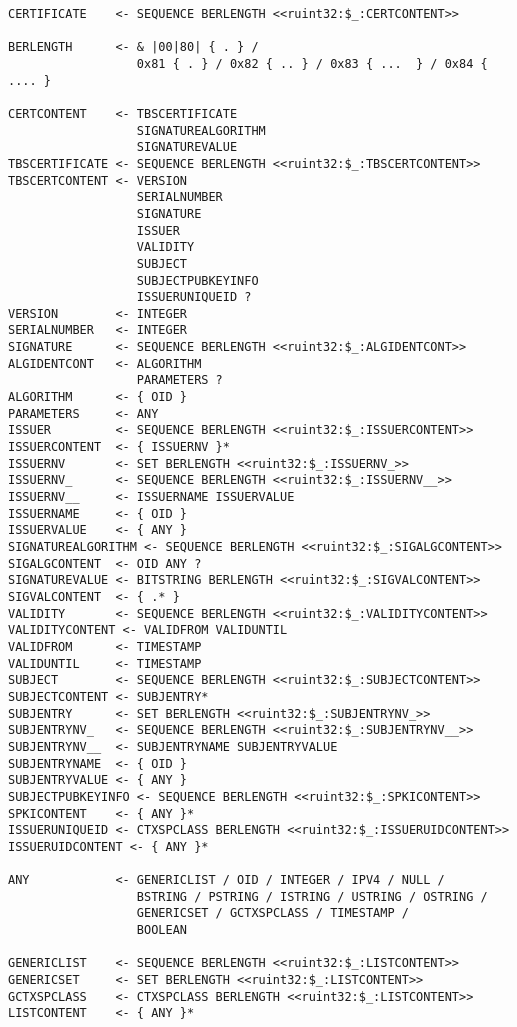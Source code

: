 \begin{changemargin}{-60mm}{0mm}
\begin{myquote}
\begin{verbatim}
CERTIFICATE    <- SEQUENCE BERLENGTH <<ruint32:$_:CERTCONTENT>>

BERLENGTH      <- & |00|80| { . } /
                  0x81 { . } / 0x82 { .. } / 0x83 { ...  } / 0x84 { .... }

CERTCONTENT    <- TBSCERTIFICATE
                  SIGNATUREALGORITHM
                  SIGNATUREVALUE
TBSCERTIFICATE <- SEQUENCE BERLENGTH <<ruint32:$_:TBSCERTCONTENT>>
TBSCERTCONTENT <- VERSION
                  SERIALNUMBER
                  SIGNATURE
                  ISSUER
                  VALIDITY
                  SUBJECT
                  SUBJECTPUBKEYINFO
                  ISSUERUNIQUEID ?
VERSION        <- INTEGER
SERIALNUMBER   <- INTEGER
SIGNATURE      <- SEQUENCE BERLENGTH <<ruint32:$_:ALGIDENTCONT>>
ALGIDENTCONT   <- ALGORITHM
                  PARAMETERS ?
ALGORITHM      <- { OID }
PARAMETERS     <- ANY
ISSUER         <- SEQUENCE BERLENGTH <<ruint32:$_:ISSUERCONTENT>>
ISSUERCONTENT  <- { ISSUERNV }*
ISSUERNV       <- SET BERLENGTH <<ruint32:$_:ISSUERNV_>>
ISSUERNV_      <- SEQUENCE BERLENGTH <<ruint32:$_:ISSUERNV__>>
ISSUERNV__     <- ISSUERNAME ISSUERVALUE
ISSUERNAME     <- { OID }
ISSUERVALUE    <- { ANY }
SIGNATUREALGORITHM <- SEQUENCE BERLENGTH <<ruint32:$_:SIGALGCONTENT>>
SIGALGCONTENT  <- OID ANY ?
SIGNATUREVALUE <- BITSTRING BERLENGTH <<ruint32:$_:SIGVALCONTENT>>
SIGVALCONTENT  <- { .* }
VALIDITY       <- SEQUENCE BERLENGTH <<ruint32:$_:VALIDITYCONTENT>>
VALIDITYCONTENT <- VALIDFROM VALIDUNTIL
VALIDFROM      <- TIMESTAMP
VALIDUNTIL     <- TIMESTAMP
SUBJECT        <- SEQUENCE BERLENGTH <<ruint32:$_:SUBJECTCONTENT>>
SUBJECTCONTENT <- SUBJENTRY*
SUBJENTRY      <- SET BERLENGTH <<ruint32:$_:SUBJENTRYNV_>>
SUBJENTRYNV_   <- SEQUENCE BERLENGTH <<ruint32:$_:SUBJENTRYNV__>>
SUBJENTRYNV__  <- SUBJENTRYNAME SUBJENTRYVALUE
SUBJENTRYNAME  <- { OID }
SUBJENTRYVALUE <- { ANY }
SUBJECTPUBKEYINFO <- SEQUENCE BERLENGTH <<ruint32:$_:SPKICONTENT>>
SPKICONTENT    <- { ANY }*
ISSUERUNIQUEID <- CTXSPCLASS BERLENGTH <<ruint32:$_:ISSUERUIDCONTENT>>
ISSUERUIDCONTENT <- { ANY }*

ANY            <- GENERICLIST / OID / INTEGER / IPV4 / NULL /
                  BSTRING / PSTRING / ISTRING / USTRING / OSTRING /
                  GENERICSET / GCTXSPCLASS / TIMESTAMP /
                  BOOLEAN

GENERICLIST    <- SEQUENCE BERLENGTH <<ruint32:$_:LISTCONTENT>>
GENERICSET     <- SET BERLENGTH <<ruint32:$_:LISTCONTENT>>
GCTXSPCLASS    <- CTXSPCLASS BERLENGTH <<ruint32:$_:LISTCONTENT>>
LISTCONTENT    <- { ANY }*


\end{verbatim}
\end{myquote}
\end{changemargin}
